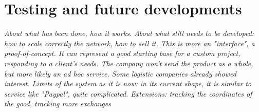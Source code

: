 \chapter{Testing and future developments}
\label{cha:future}

\textit{About what has been done, how it works. About what still needs to be developed: how to scale correctly the network, how to sell it. This is more an "interface", a proof-of-concept. It can represent a good starting base for a custom project, responding to a client's needs. The company won't send the product as a whole, but more likely an ad hoc service. Some logistic companies already showed interest. Limits of the system as it is now: in its current shape, it is similar to service like "Paypal", quite complicated. Extensions: tracking the coordinates of the good, tracking more exchanges}

